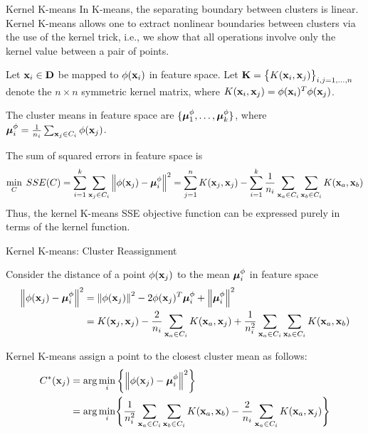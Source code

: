 \begin{frame}{Kernel K-means}
In K-means, the separating boundary between clusters is
linear. Kernel K-means 
allows one to extract nonlinear
boundaries between clusters via the use of the kernel trick, i.e., we
show that all operations involve only the kernel value between a pair of
points.
%

\medskip
Let  $\mathbf{x}_i \in \mathbf{D}$ be mapped
to $\phi(\mathbf{x}_i)$ in feature space.
Let $\mathbf{K} = \bigl\{K(\mathbf{x}_i,
\mathbf{x}_{j})\bigr\}_{i,j=1,\dots,n}$
denote the $n \times n$ symmetric kernel matrix,
where $K(\mathbf{x}_i,\mathbf{x}_{j}) = \phi(\mathbf{x}_i)^T\phi(\mathbf{x}_{j})$.

\medskip
The cluster means in
feature space are $\{{\bm \mu}^\phi_1, \ldots, {\bm \mu}^\phi_k\}$, where
${\bm \mu}^\phi_i = {1 \over n_i} \sum_{\mathbf{x}_{j} \in C_i} \phi(\mathbf{x}_{j})$.


\medskip
The sum of squared errors in feature space is
\begin{align*}
    \min_{{\relax C}} \; SSE({\relax C}) =
    \sum_{i=1}^k \sum_{\mathbf{x}_{j} \in C_i}
    \left\lVert\phi(\mathbf{x}_{j}) -{\bm \mu}^\phi_i\right\rVert^2
     = \sum_{j=1}^n K(\mathbf{x}_{j}, \mathbf{x}_{j}) -
    \sum_{i=1}^k {1\over n_i} \sum_{\mathbf{x}_a \in C_i}
      \sum_{\mathbf{x}_b \in C_i} K(\mathbf{x}_a, \mathbf{x}_b)
\end{align*}
Thus, the kernel K-means SSE objective function can be expressed purely in
terms of the kernel function.
\end{frame}

\begin{frame}{Kernel K-means: Cluster Reassignment}

Consider the distance of a point $\phi(\mathbf{x}_{j})$ to
the mean ${\bm \mu}_i^\phi$ in feature space
\begin{align*}
    \left\lVert\phi(\mathbf{x}_{j}) - {\bm \mu}^\phi_i\right\rVert^2 & =
        \left\lVert\phi(\mathbf{x}_{j})\right\rVert^2 - 2 \phi(\mathbf{x}_{j})^T{\bm \mu}^\phi_i +
        \left\lVert{\bm \mu}^\phi_i\right\rVert^2\\
     & = K(\mathbf{x}_{j}, \mathbf{x}_{j})
     - \frac{2}{n_i} \sum_{\mathbf{x}_a \in C_i} K(\mathbf{x}_a, \mathbf{x}_{j})
     + {1\over n_i^2} \sum_{\mathbf{x}_a\in C_i} \sum_{\mathbf{x}_b \in C_i}
        K(\mathbf{x}_a, \mathbf{x}_b)
\end{align*}

Kernel K-means assign a point to the closest cluster mean as
follows:
\begin{align*}
    C^*(\mathbf{x}_{j}) & = \arg \min_{i} \left\{
    \left\lVert\phi(\mathbf{x}_{j}) - {\bm \mu}^\phi_i\right\rVert^2  \right\}\\
    & = \arg \min_{i} \Biggl\{
    {1\over n_i^2} \sum_{\mathbf{x}_a\in C_i} \sum_{\mathbf{x}_b \in C_i}
        K(\mathbf{x}_a, \mathbf{x}_b)
     - \frac{2}{n_i} \sum_{\mathbf{x}_a \in C_i} K(\mathbf{x}_a, \mathbf{x}_{j})
    \Biggr\}
\end{align*}
\end{frame}


